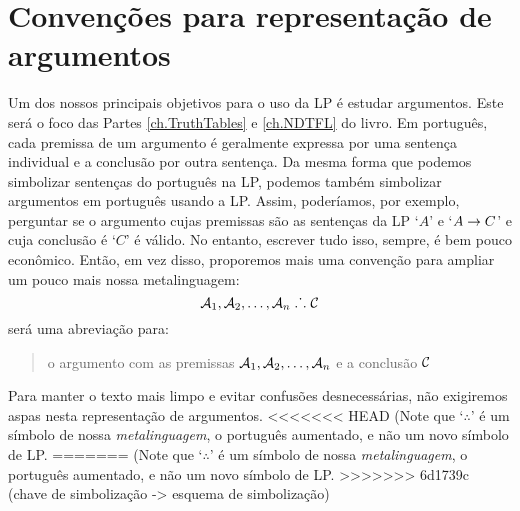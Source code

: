 \section{Convenções para representação de argumentos}
Um dos nossos principais objetivos para o uso da LP é estudar argumentos. Este será o foco das Partes \ref{ch.TruthTables} e \ref{ch.NDTFL} do livro.
Em português, cada premissa de um argumento é geralmente expressa por uma sentença individual e a conclusão por outra sentença.
Da mesma forma que podemos simbolizar sentenças do português na LP, podemos também simbolizar argumentos em português usando a LP.
Assim, poderíamos, por exemplo, perguntar se o argumento cujas premissas são as sentenças da LP `$A$' e `$A \rightarrow C$' e cuja conclusão é `$C$' é válido.
No entanto, escrever tudo isso, sempre, é bem pouco econômico.
Então, em vez disso, proporemos mais uma convenção para ampliar um pouco mais nossa metalinguagem:
	$$\mathcal{A}_1, \mathcal{A}_2, \ldots, \mathcal{A}_n \mathrel{\ldotp\dot{}\,\ldotp} \mathcal{C}$$
será uma abreviação para:
	\begin{quote}
		o argumento com as premissas $\mathcal{A}_1, \mathcal{A}_2, \ldots, \mathcal{A}_n$ e a conclusão $\mathcal{C}$
	\end{quote}
Para manter o texto mais limpo e evitar confusões desnecessárias, não exigiremos aspas nesta representação de argumentos.
<<<<<<< HEAD
(Note que `$\therefore$' é um símbolo de nossa \emph{metalinguagem}, o português aumentado, e não um novo símbolo de LP.
=======
(Note que `$\therefore$' é um símbolo de nossa \emph{metalinguagem}, o português aumentado, e não um novo símbolo de LP.
>>>>>>> 6d1739c (chave de simbolização -> esquema de simbolização)
